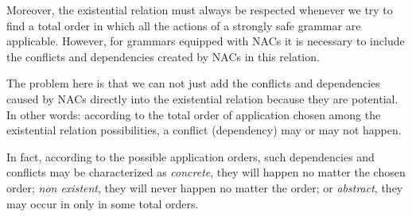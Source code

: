 Moreover, the existential relation must always be respected whenever we try to find a total order in which all the actions of a strongly safe grammar are applicable. However, for grammars equipped with NACs it is necessary to include the conflicts and dependencies created by NACs in this relation.

The problem here is that we can not just add the conflicts and dependencies caused by NACs directly into the existential relation  because they are potential. In other words: according to the total order of application chosen among the existential relation possibilities, a conflict (dependency) may or may not happen.

In fact, according to the possible application orders, such dependencies and conflicts may be characterized as \emph{concrete}, they will happen no matter the chosen order; \emph{non existent}, they will never happen no matter the order; or \emph{abstract}, they may occur in only in some total orders. 


